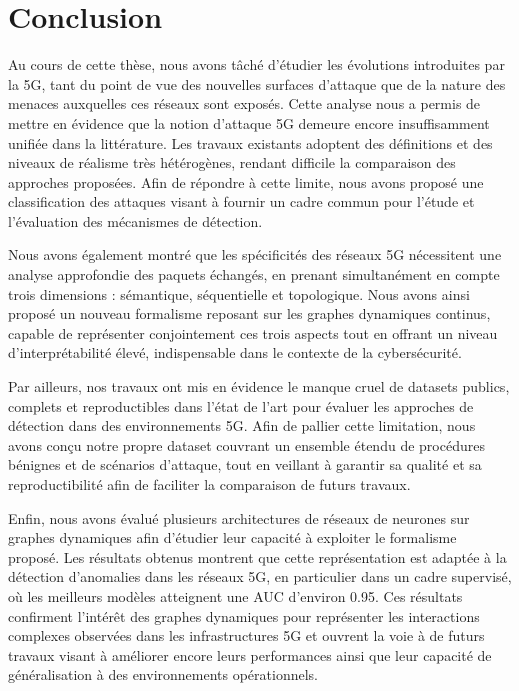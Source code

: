 \documentclass[a4paper,11pt,twoside]{StyleThese}
\begin{document}
\dominitoc
\faketableofcontents
\fi

\chapter{Conclusion}
\minitoc
Au cours de cette thèse, nous avons tâché d'étudier les évolutions introduites par la 5G, tant du point de vue des nouvelles surfaces d'attaque que de la nature des menaces auxquelles ces réseaux sont exposés. Cette analyse nous a permis de mettre en évidence que la notion d'attaque 5G demeure encore insuffisamment unifiée dans la littérature. Les travaux existants adoptent des définitions et des niveaux de réalisme très hétérogènes, rendant difficile la comparaison des approches proposées. Afin de répondre à cette limite, nous avons proposé une classification des attaques visant à fournir un cadre commun pour l'étude et l'évaluation des mécanismes de détection.

Nous avons également montré que les spécificités des réseaux 5G nécessitent une analyse approfondie des paquets échangés, en prenant simultanément en compte trois dimensions : sémantique, séquentielle et topologique. Nous avons ainsi proposé un nouveau formalisme reposant sur les graphes dynamiques continus, capable de représenter conjointement ces trois aspects tout en offrant un niveau d'interprétabilité élevé, indispensable dans le contexte de la cybersécurité.

Par ailleurs, nos travaux ont mis en évidence le manque cruel de datasets publics, complets et reproductibles dans l'état de l'art pour évaluer les approches de détection dans des environnements 5G. Afin de pallier cette limitation, nous avons conçu notre propre dataset couvrant un ensemble étendu de procédures bénignes et de scénarios d'attaque, tout en veillant à garantir sa qualité et sa reproductibilité afin de faciliter la comparaison de futurs travaux.

Enfin, nous avons évalué plusieurs architectures de réseaux de neurones sur graphes dynamiques afin d'étudier leur capacité à exploiter le formalisme proposé. Les résultats obtenus montrent que cette représentation est adaptée à la détection d'anomalies dans les réseaux 5G, en particulier dans un cadre supervisé, où les meilleurs modèles atteignent une AUC d'environ 0.95. Ces résultats confirment l'intérêt des graphes dynamiques pour représenter les interactions complexes observées dans les infrastructures 5G et ouvrent la voie à de futurs travaux visant à améliorer encore leurs performances ainsi que leur capacité de généralisation à des environnements opérationnels.
\end{document}
